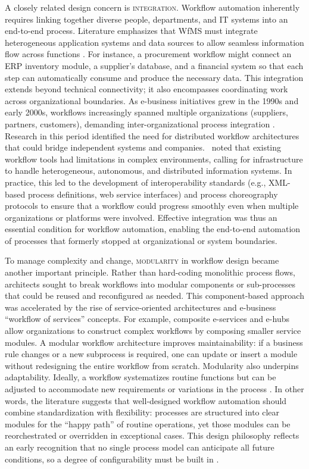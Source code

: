 A closely related design concern is \textsc{integration}. Workflow automation inherently requires linking together diverse people, departments, and IT systems into an end-to-end process. Literature emphasizes that WfMS must integrate heterogeneous application systems and data sources to allow seamless information flow across functions \parencite[cf.][pp. 289-290]{stohrWorkflow2001}. For instance, a procurement workflow might connect an ERP inventory module, a supplier's database, and a financial system so that each step can automatically consume and produce the necessary data. This integration extends beyond technical connectivity; it also encompasses coordinating work across organizational boundaries. As e-business initiatives grew in the 1990s and early 2000s, workflows increasingly spanned multiple organizations (suppliers, partners, customers), demanding inter-organizational process integration \parencite{basuResearch2002}. Research in this period identified the need for distributed workflow architectures that could bridge independent systems and companies.~\textcite{georgakopoulosOverview1995} noted that existing workflow tools had limitations in complex environments, calling for infrastructure to handle heterogeneous, autonomous, and distributed information systems. In practice, this led to the development of interoperability standards (e.g., XML-based process definitions, web service interfaces) and process choreography protocols to ensure that a workflow could progress smoothly even when multiple organizations or platforms were involved. Effective integration was thus an essential condition for workflow automation, enabling the end-to-end automation of processes that formerly stopped at organizational or system boundaries.

To manage complexity and change, \textsc{modularity} in workflow design became another important principle. Rather than hard-coding monolithic process flows, architects sought to break workflows into modular components or sub-processes that could be reused and reconfigured as needed. This component-based approach was accelerated by the rise of service-oriented architectures and e-business \enquote{workflow of services} concepts. For example, composite e-services and e-hubs allow organizations to construct complex workflows by composing smaller service modules. A modular workflow architecture improves maintainability: if a business rule changes or a new subprocess is required, one can update or insert a module without redesigning the entire workflow from scratch. Modularity also underpins adaptability. Ideally, a workflow systematizes routine functions but can be adjusted to accommodate new requirements or variations in the process \parencite[cf.][p. 10]{basuResearch2002}. In other words, the literature suggests that well-designed workflow automation should combine standardization with flexibility: processes are structured into clear modules for the \enquote{happy path} of routine operations, yet those modules can be reorchestrated or overridden in exceptional cases. This design philosophy reflects an early recognition that no single process model can anticipate all future conditions, so a degree of configurability must be built in \parencite{georgakopoulosOverview1995}.

